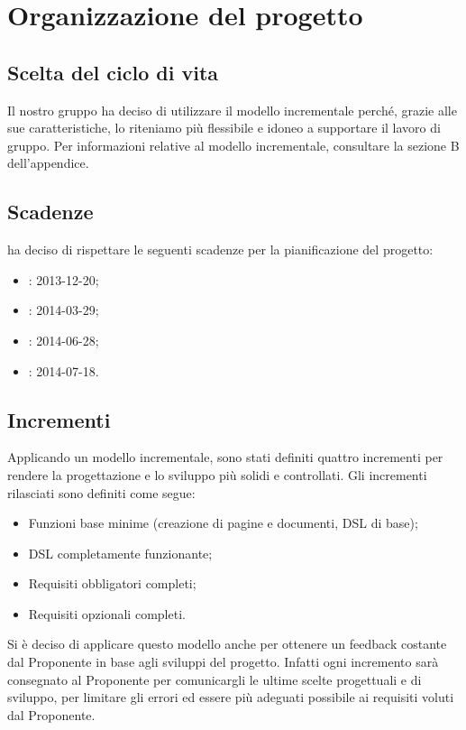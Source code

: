 \newpage

				
\section{Organizzazione del progetto}

\subsection{Scelta del ciclo di vita}
\label{2.5}
Il nostro gruppo ha deciso di utilizzare il modello incrementale perché, grazie alle sue caratteristiche, lo riteniamo più flessibile e idoneo a supportare il lavoro di gruppo. Per informazioni relative al modello incrementale, consultare la sezione B dell'appendice.

\subsection{Scadenze}
\label{2.6}
\NomeGruppo{} ha deciso di rispettare le seguenti scadenze per la pianificazione del progetto:
\begin{itemize}
\item {}: 2013-12-20;
\item {}:  2014-03-29;
\item {}: 2014-06-28;
\item {}: 2014-07-18.
\end{itemize}

\subsection{Incrementi}
Applicando un modello incrementale, sono stati definiti quattro incrementi per rendere la progettazione e lo sviluppo più solidi e controllati. Gli incrementi rilasciati sono definiti come segue:
\begin{itemize}
\item Funzioni base minime (creazione di pagine e documenti, DSL di base);
\item DSL completamente funzionante;
\item Requisiti obbligatori completi;
\item Requisiti opzionali completi.
\end{itemize}
Si è deciso di applicare questo modello anche per ottenere un feedback costante dal Proponente in base agli sviluppi del progetto. Infatti ogni incremento sarà consegnato al Proponente per comunicargli le ultime scelte progettuali e di sviluppo, per limitare gli errori ed essere più adeguati possibile ai requisiti voluti dal Proponente.


